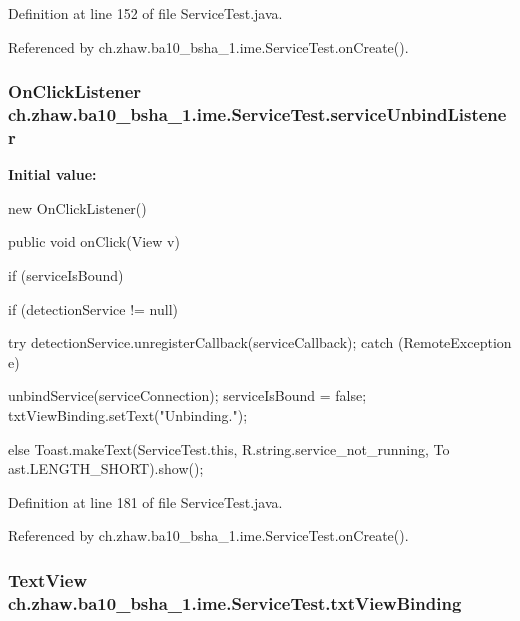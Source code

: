 Definition at line 152 of file ServiceTest.java.

Referenced by ch.zhaw.ba10\_\-bsha\_\-1.ime.ServiceTest.onCreate().\hypertarget{classch_1_1zhaw_1_1ba10__bsha__1_1_1ime_1_1ServiceTest_aa8c033e5421b4479f79d96f776aef94b}{
\subsubsection[{serviceUnbindListener}]{\setlength{\rightskip}{0pt plus 5cm}OnClickListener {\bf ch.zhaw.ba10\_\-bsha\_\-1.ime.ServiceTest.serviceUnbindListener}}}
\label{classch_1_1zhaw_1_1ba10__bsha__1_1_1ime_1_1ServiceTest_aa8c033e5421b4479f79d96f776aef94b}
{\bfseries Initial value:}
\begin{DoxyCode}
 new OnClickListener() {
        public void onClick(View v) {
            if (serviceIsBound) {
                
                
                if (detectionService != null) {
                    try {
                        detectionService.unregisterCallback(serviceCallback);
                    } catch (RemoteException e) {
                        
                        
                    }
                }
                
                
                unbindService(serviceConnection);
                serviceIsBound = false;
                txtViewBinding.setText("Unbinding.");
            } else {
                Toast.makeText(ServiceTest.this, R.string.service_not_running, To
      ast.LENGTH_SHORT).show();
            }
        }
    }
\end{DoxyCode}


Definition at line 181 of file ServiceTest.java.

Referenced by ch.zhaw.ba10\_\-bsha\_\-1.ime.ServiceTest.onCreate().\hypertarget{classch_1_1zhaw_1_1ba10__bsha__1_1_1ime_1_1ServiceTest_a3c1a17a86c78afadef203bdfee113859}{
\subsubsection[{txtViewBinding}]{\setlength{\rightskip}{0pt plus 5cm}TextView {\bf ch.zhaw.ba10\_\-bsha\_\-1.ime.ServiceTest.txtViewBinding}}}
\label{classch_1_1zhaw_1_1ba10__bsha__1_1_1ime_1_1ServiceTest_a3c1a17a86c78afadef203bdfee113859}


